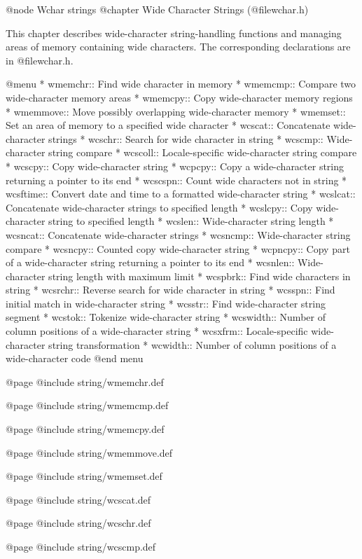 @node Wchar strings
@chapter Wide Character Strings (@file{wchar.h})

This chapter describes wide-character string-handling functions and
managing areas of memory containing wide characters.  The corresponding 
declarations are in @file{wchar.h}.

@menu
* wmemchr::     Find wide character in memory
* wmemcmp::     Compare two wide-character memory areas
* wmemcpy::     Copy wide-character memory regions
* wmemmove::    Move possibly overlapping wide-character memory
* wmemset::     Set an area of memory to a specified wide character
* wcscat::      Concatenate wide-character strings
* wcschr::      Search for wide character in string
* wcscmp::      Wide-character string compare
* wcscoll::     Locale-specific wide-character string compare
* wcscpy::      Copy wide-character string
* wcpcpy::      Copy a wide-character string returning a pointer to its end
* wcscspn::     Count wide characters not in string
* wcsftime::    Convert date and time to a formatted wide-character string
* wcslcat::     Concatenate wide-character strings to specified length
* wcslcpy::     Copy wide-character string to specified length
* wcslen::      Wide-character string length
* wcsncat::     Concatenate wide-character strings
* wcsncmp::     Wide-character string compare
* wcsncpy::     Counted copy wide-character string
* wcpncpy::     Copy part of a wide-character string returning a pointer to its end
* wcsnlen::     Wide-character string length with maximum limit
* wcspbrk::     Find wide characters in string
* wcsrchr::     Reverse search for wide character in string
* wcsspn::      Find initial match in wide-character string
* wcsstr::      Find wide-character string segment
* wcstok::      Tokenize wide-character string
* wcswidth::    Number of column positions of a wide-character string
* wcsxfrm::     Locale-specific wide-character string transformation
* wcwidth::     Number of column positions of a wide-character code
@end menu

@page
@include string/wmemchr.def

@page
@include string/wmemcmp.def

@page
@include string/wmemcpy.def

@page
@include string/wmemmove.def

@page
@include string/wmemset.def

@page
@include string/wcscat.def

@page
@include string/wcschr.def

@page
@include string/wcscmp.def

